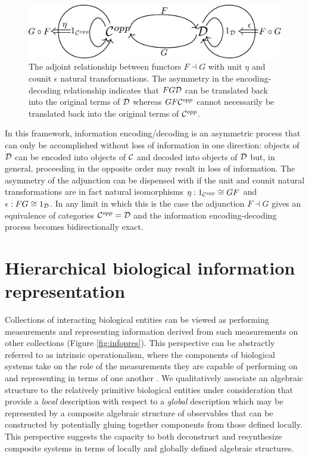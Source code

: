 \documentclass[aps,twocolumn]{revtex4-1}
\begin{document}
\begin{figure}
\noindent\includegraphics[width=0.9\columnwidth]{fig/adjunction.pdf}
\caption{The adjoint relationship between functors $F \dashv G$ with unit $\eta$ and counit $\epsilon$ natural transformations. The asymmetry in the encoding-decoding relationship indicates that $FG {\mathcal D}$ can be translated back into the original terms of ${\mathcal D}$ whereas $GF {\mathcal C}^{opp}$ cannot necessarily be translated back into the original terms of ${\mathcal C}^{opp}$.}
\label{fig:adjunction}
\end{figure}

In this framework, information encoding/decoding is an asymmetric process that can only be accomplished without loss of information in one direction: objects of ${\mathcal D}$ can be encoded into objects of ${\mathcal C}$ and decoded into objects of ${\mathcal D}$ but, in general, proceeding in the opposite order may result in loss of information. The asymmetry of the adjunction can be dispensed with if the unit and counit natural transformations are in fact natural isomorphisms $\eta: 1_{{\mathcal C}^{opp}} \cong GF$ and $\epsilon: FG \cong 1_{{\mathcal D}}$. In any limit in which this is the case the adjunction $F \dashv G$ gives an equivalence of categories ${\mathcal C}^{opp} = {\mathcal D}$ and the information encoding-decoding process becomes bidirectionally exact.


\section{Hierarchical biological information representation}
Collections of interacting biological entities can be viewed as performing measurements and representing information derived from such measurements on other collections (Figure \ref{fig:infopres}). This perspective can be abstractly referred to as intrinsic operationalism, where the components of biological systems take on the role of the measurements they are capable of performing on and representing in terms of one another \cite{Wolkenhauer2007,Houle2011}. We qualitatively associate an algebraic structure to the relatively primitive biological entities under consideration that provide a {\it local} description with respect to a {\it global} description which may be represented by a composite algebraic structure of observables that can be constructed by potentially gluing together components from those defined locally. This perspective suggests the capacity to both deconstruct and resynthesize composite systems in terms of locally and globally defined algebraic structures.
\end{document}

